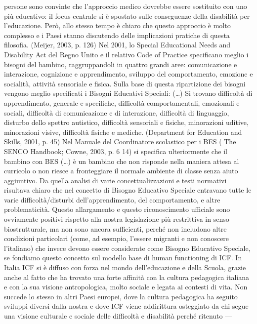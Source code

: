 persone sono convinte che l'approccio medico dovrebbe essere sostituito con uno più educativo: il
focus centrale si è spostato sulle conseguenze della disabilità per l'educazione. Però, allo stesso
tempo è chiaro che questo approccio è molto complesso e i Paesi stanno discutendo delle
implicazioni pratiche di questa filosofia. (Meijer, 2003, p. 126)
Nel 2001, lo Special Educational Needs and Disability Act del Regno Unito e il relativo Code of
Practice specificano meglio i bisogni del bambino, raggruppandoli in quattro grandi aree:
comunicazione e interazione, cognizione e apprendimento, sviluppo del comportamento,
emozione e socialità, attività sensoriale e fisica. Sulla base di questa ripartizione dei bisogni
vengono meglio specificati i Bisogni Educativi Speciali:
(…) Si trovano difficoltà di apprendimento, generale e specifiche, difficoltà comportamentali,
emozionali e sociali, difficoltà di comunicazione e di interazione, difficoltà di linguaggio, disturbo
dello spettro autistico, difficoltà sensoriali e fisiche, minorazioni uditive, minorazioni visive,
difficoltà fisiche e mediche. (Department for Education and Skills, 2001, p. 45)
Nel Manuale del Coordinatore scolastico per i BES ( The SENCO Handbook; Cowne, 2003, p.
6
14) si specifica ulteriormente che il bambino con BES
(…) è un bambino che non risponde nella maniera attesa al curricolo o non riesce a
fronteggiare il normale ambiente di classe senza aiuto aggiuntivo.
Da quella analisi di varie concettualizzazioni e testi normativi risultava chiaro che nel concetto di
Bisogno Educativo Speciale entravano tutte le varie difficoltà/disturbi dell’apprendimento, del
comportamento, e altre problematicità. Questo allargamento e questo riconoscimento ufficiale
sono ovviamente positivi rispetto alla nostra legislazione più restrittiva in senso biostrutturale, ma
non sono ancora sufficienti, perché non includono altre condizioni particolari (come, ad esempio,
l’essere migranti e non conoscere l’italiano) che invece devono essere considerate come Bisogno
Educativo Speciale, se fondiamo questo concetto sul modello base di human functioning di ICF.
In Italia ICF si è diffuso con forza nel mondo dell’educazione e della Scuola, grazie anche al
fatto che ha trovato una forte affinità con la cultura pedagogica italiana e con la sua visione
antropologica, molto sociale e legata ai contesti di vita. Non succede lo stesso in altri Paesi europei,
dove la cultura pedagogica ha seguito sviluppi diversi dalla nostra e dove ICF viene addirittura
osteggiato da chi segue una visione culturale e sociale delle difficoltà e disabilità perché ritenuto —
